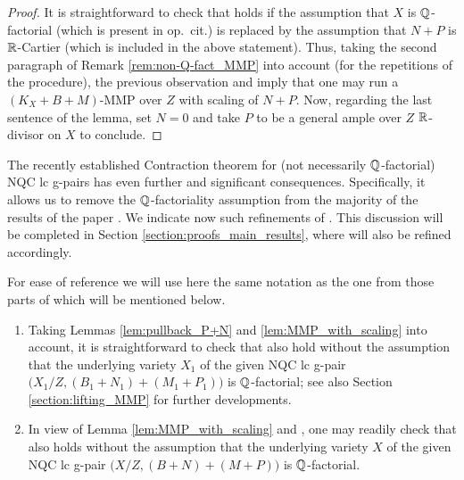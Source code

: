 	\begin{proof}
		It is straightforward to check that \cite[Corollary 5.22]{HaconLiu21} holds if the assumption that $ X $ is $ \mathbb{Q} $-factorial (which is present in op.\ cit.) is replaced by the assumption that $ N+P $ is $ \mathbb{R} $-Cartier (which is included in the above statement). Thus, taking the second paragraph of Remark \ref{rem:non-Q-fact_MMP} into account (for the repetitions of the procedure), the previous observation and \cite[Theorem 1.5]{Xie22} imply that one may run a $ (K_X+B+M) $-MMP over $ Z $ with scaling of $ N+P $. Now, regarding the last sentence of the lemma, set $ N = 0 $ and take $ P $ to be a general ample over $ Z $ $\mathbb{R}$-divisor on $X$ to conclude.
	\end{proof}
	
	The recently established Contraction theorem for (not necessarily $\mathbb{Q}$-factorial) NQC lc g-pairs has even further and significant consequences. Specifically, it allows us to remove the $ \mathbb{Q} $-factoriality assumption from the majority of the results of the paper \cite{LT22b}. We indicate now such refinements of \cite[Lemma 2.13, Theorem 2.14, Lemma 2.16 and Theorem 4.1]{LT22b}. This discussion will be completed in Section \ref{section:proofs_main_results}, where \cite[Proposition A.3, Theorem 1.2, Corollaries 1.3 and 1.4, and Theorem 1.5]{LT22b} will also be refined accordingly.
	
	\begin{rem}\label{rem:comments_on_LT22b}
		For ease of reference we will use here the same notation as the one from those parts of \cite{LT22b} which will be mentioned below.
		\begin{enumerate}[(1)]
			\item Taking Lemmas \ref{lem:pullback_P+N} and \ref{lem:MMP_with_scaling} into account, it is straightforward to check that 
			\cite[Lemma 2.13 and Theorem 2.14]{LT22b} also hold without the assumption that the underlying variety $ X_1 $ of the given NQC lc g-pair $ \big( X_1/Z , (B_1+N_1) + (M_1+P_1) \big) $ is $ \mathbb{Q} $-factorial; see also Section \ref{section:lifting_MMP} for further developments.
			
			\item In view of Lemma \ref{lem:MMP_with_scaling} and \cite[Section 3]{LX22a}, one may readily check that \cite[Lemma 2.16]{LT22b} also holds without the assumption that the underlying variety $ X $ of the given NQC lc g-pair $ \big( X/Z , (B+N) + (M+P) \big) $ is $ \mathbb{Q} $-factorial.
		\end{enumerate}
	\end{rem}
	
